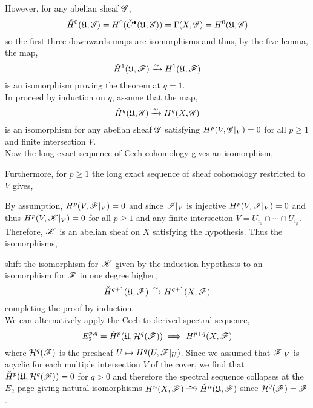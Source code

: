 \documentclass[12pt]{article}
\begin{document}
However, for any abelian sheaf $\mathscr{G}$,
\[ \check{H}^0(\mathfrak{U}, \mathscr{G}) = H^0(\check{C}^\bullet(\mathfrak{U}, \mathscr{G})) = \Gamma(X, \mathscr{G}) = H^0(\mathfrak{U}, \mathscr{G}) \]
so the first three downwards maps are isomorphisms and thus, by the five lemma, the map,
\[ \check{H}^1(\mathfrak{U}, \mathscr{F}) \xrightarrow{\sim} H^1(\mathfrak{U}, \mathscr{F}) \]
is an isomorphism proving the theorem at $q = 1$. 
\bigskip\\
In proceed by induction on $q$, assume that the map,
\[ \check{H}^q(\mathfrak{U}, \mathscr{G}) \xrightarrow{\sim} H^q(X, \mathscr{G}) \]
is an isomorphism for any abelian sheaf $\mathscr{G}$ satisfying $H^p(V, \mathscr{G}|_V) = 0$ for all $p \ge 1$ and finite intersection $V$. 
\bigskip\\
Now the long exact sequence of Cech cohomology gives an isomorphism,
\begin{center}
\end{center}
Furthermore, for $p \ge 1$ the long exact sequence of sheaf cohomology restricted to $V$ gives,
\begin{center}
\end{center}
By assumption, $H^p(V, \mathscr{F}|_V) = 0$ and since $\mathscr{I}|_V$ is injective $H^p(V, \mathscr{I}|_V) = 0$ and thus $H^p(V, \mathscr{K}|_V) = 0$ for all $p \ge 1$ and any finite intersection $V = U_{i_0} \cap \cdots \cap U_{i_p}$. Therefore, $\mathscr{K}$ is an abelian sheaf on $X$ satisfying the hypothesis. Thus the isomorphisms,
\begin{center}
\end{center}
shift the isomorphism for $\mathscr{K}$ given by the induction hypothesis to an isomorphism for $\mathscr{F}$ in one degree higher,
\[ \check{H}^{q+1}(\mathfrak{U}, \mathscr{F}) \xrightarrow{\sim} H^{q+1}(X, \mathscr{F}) \]
completing the proof by induction.
\bigskip\\
We can alternatively apply the Cech-to-derived spectral sequence,
\[ E_2^{p,q} = \check{H}^p(\mathfrak{U}, \mathcal{H}^q(\mathscr{F})) \implies H^{p+q}(X, \mathscr{F}) \]
where $\mathcal{H}^q(\mathscr{F})$ is the presheaf $U \mapsto H^q(U, \mathscr{F}|_U)$. Since we assumed that $\mathscr{F}|_V$ is acyclic for each multiple intersection $V$ of the cover, we find that $\check{H}^p(\mathfrak{U}, \mathcal{H}^q(\mathscr{F})) = 0$ for $q > 0$ and therefore the spectral sequence collapses at the $E_2$-page giving natural isomorphisms $H^n(X, \F) \iso \check{H}^n(\U, \F)$ since $\mathcal{H}^0(\mathscr{F}) = \mathscr{F}$. 
\end{document}

